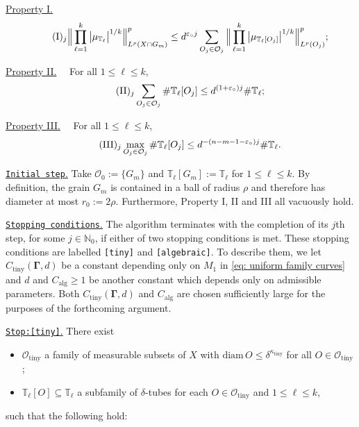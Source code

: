 \documentclass[reqno]{amsart}
\numberwithin{equation}{section}
\newcommand{\T}{\mathbb{T}}
\newcommand{\cO}{\mathcal{O}}
\newcommand{\bdGamma}{\boldsymbol{\Gamma}}
\theoremstyle{plain}
\theoremstyle{definition}
\newcommand{\ttiny}{\mathrm{tiny}}
\newcommand{\alg}{\mathrm{alg}}
\newcommand{\diam}{\mathrm{diam}}
\begin{document}
\noindent\underline{Property I.} 
\begin{equation}\tag*{$(\mathrm{I})_j$}
      \Big\|\prod_{\ell = 1}^k \big| \mu_{\T_{\ell}} \big|^{1/k} \Big\|_{L^p(X \cap G_m)}^p \leq d^{\varepsilon_{\circ}j} \sum_{O_{j} \in \cO_{j}} \Big\|\prod_{\ell = 1}^k \big| \mu_{\T_{\ell}[O_j]} \big|^{1/k}\Big\|_{L^p(O_j)}^p;
\end{equation}


\noindent\underline{Property II.} \ \ For all $1\le \ell \le k$,
\begin{equation}\tag*{$(\mathrm{II})_j$}
    \sum_{O_{j} \in \cO_{j}} \# \T_{\ell}[O_j] \leq d^{(1+\varepsilon_{\circ})j}  \#\T_{\ell};
\end{equation}

\noindent\underline{Property III.} \ \ For all $1\le \ell \le k$,
\begin{equation}\tag*{$(\mathrm{III})_j$}
     \max_{O_{j} \in \cO_{j}} \#\T_{\ell}[O_{j}] \leq  d^{-(n-m-1-\varepsilon_{\circ})j}  \#\T_{\ell}.
\end{equation}

\noindent\underline{\texttt{Initial step}.} Take $\cO_0 := \{G_m\}$ and $\T_{\ell}[G_m] := \T_{\ell}$ for $1 \leq \ell \leq k$. By definition, the grain $G_m$ is contained in  a ball of radius $\rho$ and therefore has diameter at most $r_0 := 2 \rho$. Furthermore, Property I, II and III all vacuously hold.\medskip

%
%
%

\noindent\underline{\texttt{Stopping conditions}.} The algorithm terminates with the completion of its $j$th step, for some $j\in \mathbb{N}_0$, if either of two stopping conditions is met. These stopping conditions are labelled \texttt{[tiny]} and \texttt{[algebraic]}. To describe them, we let $C_{\ttiny}(\bdGamma, d)$ be a constant depending only on $M_1$ in \eqref{eq: uniform family curves} and $d$ and $C_{\alg} \geq 1$ be another constant which depends only on admissible parameters. Both $C_{\ttiny}(\bdGamma, d)$ and $C_{\alg}$ are chosen sufficiently large for the purposes of the forthcoming argument.\medskip 


\noindent \underline{\texttt{Stop:[tiny]}.} There exist
\begin{itemize}
    \item $\cO_{\ttiny}$ a family of measurable subsets of $X$ with $\diam\,O \leq \delta^{\kappa_{\ttiny}}$ for all $O \in \cO_{\ttiny}$;
    \item $\T_{\ell}[O] \subseteq \T_{\ell}$ a subfamily of $\delta$-tubes for each $O \in \cO_{\ttiny}$ and $1 \leq \ell \leq k$,
\end{itemize}
such that the following hold:\medskip
\end{document}
